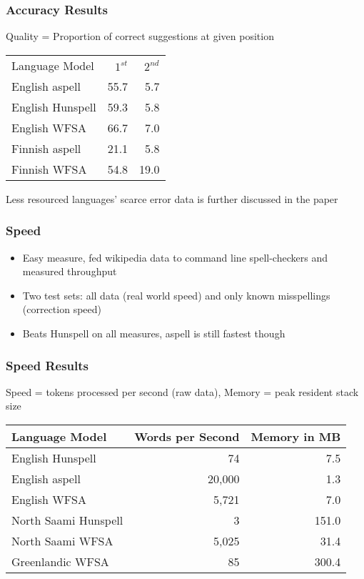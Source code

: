 \documentclass[t,12pt]{beamer}
\begin{document}
\begin{frame}
    \frametitle{Accuracy Results}
    Quality = Proportion of correct suggestions at given position
    \begin{tabular}{l|rr}
        Language Model & $1^{st}$ & $2^{nd}$ \\
        English aspell &55.7 & 5.7 \\
        English Hunspell &59.3 & 5.8 \\
        English WFSA &66.7 & 7.0 \\
 \hline 
 Finnish aspell & 21.1 & 5.8 \\ 
 Finnish WFSA  & 54.8 & 19.0 \\
\end{tabular}
Less resourced languages' scarce error data is further discussed in the paper
\end{frame}

\begin{frame}
    \frametitle{Speed}
    \begin{itemize}
        \item Easy measure, fed wikipedia data to command line spell-checkers
            and measured throughput
        \item Two test sets: all data (real world speed) and only known
            misspellings (correction speed)
        \item Beats Hunspell on all measures, aspell is still fastest though
    \end{itemize}
\end{frame}

\begin{frame}
    \frametitle{Speed Results}
    Speed = tokens processed per second (raw data), Memory = peak resident stack
    size
    \begin{tabular}{l|rr}
        Language Model & Words per Second & Memory in MB\\
        \hline
       English Hunspell & 74 & 7.5 \\
       English aspell & 20,000 & 1.3 \\
       English WFSA & 5,721 & 7.0 \\
        \hline
        North Saami Hunspell & 3 & 151.0 \\
       North Saami WFSA & 5,025 & 31.4 \\
        \hline
        Greenlandic WFSA & 85 & 300.4 \\
    \end{tabular}
\end{frame}
\end{document}
